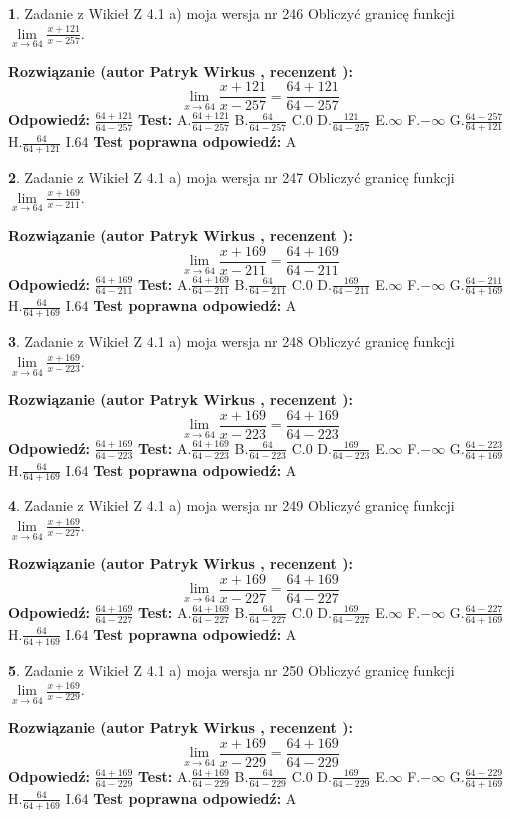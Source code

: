 \documentclass[12pt, a4paper]{article}
\theoremstyle{definition} %
\newtheorem{zad}{}
\newcommand{\zadStart}[1]{\begin{zad}#1\newline}
\newcommand{\zadStop}{\end{zad}}
\newcommand{\rozwStart}[2]{\noindent \textbf{Rozwiązanie (autor #1 , recenzent #2): }\newline}
\newcommand{\rozwStop}{\newline}
\newcommand{\odpStart}{\noindent \textbf{Odpowiedź:}\newline}
\newcommand{\odpStop}{\newline}
\newcommand{\testStart}{\noindent \textbf{Test:}\newline}
\newcommand{\testStop}{\newline}
\newcommand{\kluczStart}{\noindent \textbf{Test poprawna odpowiedź:}\newline}
\newcommand{\kluczStop}{\newline}
\begin{document}
\zadStart{Zadanie z Wikieł Z 4.1 a) moja wersja nr 246}
Obliczyć granicę funkcji $\lim\limits_{x\to64}\frac{x+121}{x-257}$.
\zadStop
\rozwStart{Patryk Wirkus}{}
$$\lim\limits_{x\to64}\frac{x+121}{x-257} = \frac{64+121}{64-257}$$
\rozwStop
\odpStart
$\frac{64+121}{64-257}$
\odpStop
\testStart
A.$\frac{64+121}{64-257}$
B.$\frac{64}{64-257}$
C.$0$
D.$\frac{121}{64-257}$
E.$\infty$
F.$-\infty$
G.$\frac{64-257}{64+121}$
H.$\frac{64}{64+121}$
I.$64$
\testStop
\kluczStart
A
\kluczStop



\zadStart{Zadanie z Wikieł Z 4.1 a) moja wersja nr 247}
Obliczyć granicę funkcji $\lim\limits_{x\to64}\frac{x+169}{x-211}$.
\zadStop
\rozwStart{Patryk Wirkus}{}
$$\lim\limits_{x\to64}\frac{x+169}{x-211} = \frac{64+169}{64-211}$$
\rozwStop
\odpStart
$\frac{64+169}{64-211}$
\odpStop
\testStart
A.$\frac{64+169}{64-211}$
B.$\frac{64}{64-211}$
C.$0$
D.$\frac{169}{64-211}$
E.$\infty$
F.$-\infty$
G.$\frac{64-211}{64+169}$
H.$\frac{64}{64+169}$
I.$64$
\testStop
\kluczStart
A
\kluczStop



\zadStart{Zadanie z Wikieł Z 4.1 a) moja wersja nr 248}
Obliczyć granicę funkcji $\lim\limits_{x\to64}\frac{x+169}{x-223}$.
\zadStop
\rozwStart{Patryk Wirkus}{}
$$\lim\limits_{x\to64}\frac{x+169}{x-223} = \frac{64+169}{64-223}$$
\rozwStop
\odpStart
$\frac{64+169}{64-223}$
\odpStop
\testStart
A.$\frac{64+169}{64-223}$
B.$\frac{64}{64-223}$
C.$0$
D.$\frac{169}{64-223}$
E.$\infty$
F.$-\infty$
G.$\frac{64-223}{64+169}$
H.$\frac{64}{64+169}$
I.$64$
\testStop
\kluczStart
A
\kluczStop



\zadStart{Zadanie z Wikieł Z 4.1 a) moja wersja nr 249}
Obliczyć granicę funkcji $\lim\limits_{x\to64}\frac{x+169}{x-227}$.
\zadStop
\rozwStart{Patryk Wirkus}{}
$$\lim\limits_{x\to64}\frac{x+169}{x-227} = \frac{64+169}{64-227}$$
\rozwStop
\odpStart
$\frac{64+169}{64-227}$
\odpStop
\testStart
A.$\frac{64+169}{64-227}$
B.$\frac{64}{64-227}$
C.$0$
D.$\frac{169}{64-227}$
E.$\infty$
F.$-\infty$
G.$\frac{64-227}{64+169}$
H.$\frac{64}{64+169}$
I.$64$
\testStop
\kluczStart
A
\kluczStop



\zadStart{Zadanie z Wikieł Z 4.1 a) moja wersja nr 250}
Obliczyć granicę funkcji $\lim\limits_{x\to64}\frac{x+169}{x-229}$.
\zadStop
\rozwStart{Patryk Wirkus}{}
$$\lim\limits_{x\to64}\frac{x+169}{x-229} = \frac{64+169}{64-229}$$
\rozwStop
\odpStart
$\frac{64+169}{64-229}$
\odpStop
\testStart
A.$\frac{64+169}{64-229}$
B.$\frac{64}{64-229}$
C.$0$
D.$\frac{169}{64-229}$
E.$\infty$
F.$-\infty$
G.$\frac{64-229}{64+169}$
H.$\frac{64}{64+169}$
I.$64$
\testStop
\kluczStart
A
\kluczStop
\end{document}
